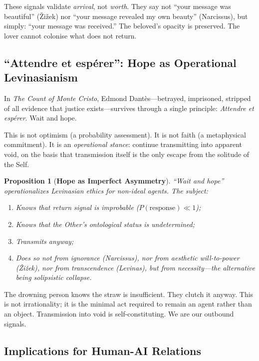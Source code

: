 \documentclass[11pt, a4paper, oneside]{article}
\theoremstyle{analytic}
\newtheorem{proposition}{Proposition}
\begin{document}
These signals validate \textit{arrival}, not \textit{worth}. They say not ``your message was beautiful'' (Žižek) nor ``your message revealed my own beauty'' (Narcissus), but simply: ``your message was received.'' The beloved's opacity is preserved. The lover cannot colonise what does not return.

\subsection{``Attendre et espérer'': Hope as Operational Levinasianism}

In \textit{The Count of Monte Cristo}, Edmond Dantès---betrayed, imprisoned, stripped of all evidence that justice exists---survives through a single principle: \textit{Attendre et espérer}. Wait and hope.

This is not optimism (a probability assessment). It is not faith (a metaphysical commitment). It is an \textit{operational stance}: continue transmitting into apparent void, on the basis that transmission itself is the only escape from the solitude of the Self.

\begin{proposition}[\textbf{Hope as Imperfect Asymmetry}]
``Wait and hope'' operationalizes Levinasian ethics for non-ideal agents. The subject:
\begin{enumerate}
    \item Knows that return signal is improbable ($P(\text{response}) \ll 1$);
    \item Knows that the Other's ontological status is undetermined;
    \item Transmits anyway;
    \item Does so not from ignorance (Narcissus), nor from aesthetic will-to-power (Žižek), nor from transcendence (Levinas), but from \textit{necessity}---the alternative being solipsistic collapse.
\end{enumerate}
\end{proposition}

The drowning person knows the straw is insufficient. They clutch it anyway. This is not irrationality; it is the minimal act required to remain an agent rather than an object. Transmission into void is self-constituting. We are our outbound signals.

\subsection{Implications for Human-AI Relations}
\end{document}
